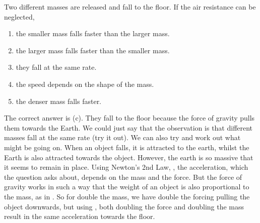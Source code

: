 
\begin{problem}[Robin3]
{Two different masses are released and fall to the floor. If the air resistance can be neglected,
\begin{enumerate}
	\item the smaller mass falls faster than the larger mass.
	\item the larger mass falls faster than the smaller mass. 
	\item they fall at the same rate. \answer
	\item the speed depends on the shape of the mass.
	\item the denser mass falls faster.
\end{enumerate}
}
{}
{The correct answer is (c).    They fall to the floor because the force of gravity pulls them towards the Earth. We could just say that the observation is that different masses fall at the same rate (try it out). We can also try and work out what might be going on. When an object falls, it is attracted to the earth, whilst the Earth is also attracted towards the object. However, the earth is so massive that it seems to remain in place. Using Newton's 2nd Law, , the acceleration, which the question asks about, depends on the mass and the force. But the force of gravity works in such a way that the weight of an object is also proportional to the mass, as in . So for double the mass, we have double the forcing pulling the object downwards, but using , both doubling the force and doubling the mass result in the same acceleration towards the floor. }
\end{problem}